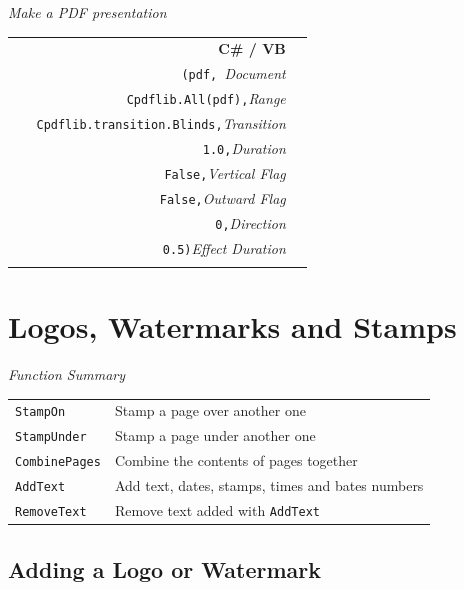 \documentclass[a4paper]{memoir}
\begin{document}
\begin{framed}
\noindent\textit{Make a PDF presentation}

\vspace{2mm}
\noindent\begin{tabular}{rl}
\small\sffamily\textbf{C\# / VB} &
\begin{minipage}{4in}
\begin{tabbing}
\small\verb!Cpdflib.AddPresentation           !\=\\
\small\verb!  (pdf, !\>\textit{Document}\\
\small\verb!   Cpdflib.All(pdf),!\>\textit{Range}\\
\small\verb!   Cpdflib.transition.Blinds,!\>\textit{Transition}\\
\small\verb!   1.0,!\>\textit{Duration}\\
\small\verb!   False,!\>\textit{Vertical Flag}\\
\small\verb!   False,!\>\textit{Outward Flag}\\
\small\verb!   0,!\>\textit{Direction}\\
\small\verb!   0.5)!\>\textit{Effect Duration}\\
\end{tabbing}
\end{minipage}
\end{tabular}
\end{framed}

\chapter{Logos, Watermarks and Stamps}
\begin{framed}
\noindent\textit{Function Summary}\\[2mm]
\noindent\begin{tabular}{ll}
\verb!StampOn! & Stamp a page over another one\\
\verb!StampUnder! & Stamp a page under another one\\
\verb!CombinePages! & Combine the contents of pages together\\[5mm]
\verb!AddText! & Add text, dates, stamps, times and bates numbers\\
\verb!RemoveText! & Remove text added with \verb!AddText!
\end{tabular}
\end{framed}

\section{Adding a Logo or Watermark}
\end{document}
